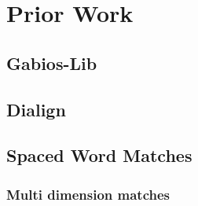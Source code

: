 \chapter{Prior Work}


\section{Gabios-Lib}

\section{Dialign}

\section{Spaced Word Matches}

\subsection{Multi dimension matches}